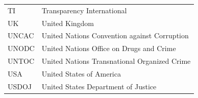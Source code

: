 \documentclass[
  letterpaper,
  DIV=11,
  numbers=noendperiod]{scrreprt}
\begin{document}
\begin{longtable}[]{@{}
  >{\raggedright\arraybackslash}p{}
  >{\raggedright\arraybackslash}p{}@{}}
TI & Transparency International \\
UK & United Kingdom \\
UNCAC & United Nations Convention against Corruption \\
UNODC & United Nations Office on Drugs and Crime \\
UNTOC & United Nations Transnational Organized Crime \\
USA & United States of America \\
USDOJ & United States Department of Justice \\
\end{longtable}
\end{document}
